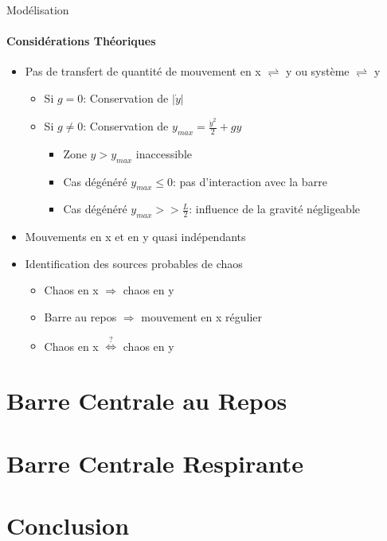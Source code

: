 \documentclass{beamer}
\begin{document}
  \begin{frame}{Modélisation}
  \framesubtitle{Considérations Théoriques}
  \begin{itemize}
    \item Pas de transfert de quantité de mouvement en x \(\rightleftharpoons\) y ou système \(\rightleftharpoons\) y
     \begin{itemize}
       \item Si \(g=0\): Conservation de \(\lvert \dot{y} \rvert\)
       \item Si \(g\neq0\): Conservation de \(y_{max}=\frac{\dot{y}^2}{2}+gy\)
       \begin{itemize}
         \item Zone \(y>y_{max}\) inaccessible
         \item Cas dégénéré \(y_{max} \leq 0\): pas d'interaction avec la barre
         \item Cas dégénéré \(y_{max} >> \frac{L}{2}\): influence de la gravité négligeable
       \end{itemize}
     \end{itemize}
    \item Mouvements en x et en y quasi indépendants
    \item Identification des sources probables de chaos
    \begin{itemize}
      \item Chaos en x \(\Rightarrow\) chaos en y
      \item Barre au repos \(\Rightarrow\) mouvement en x régulier
      \item Chaos en x \(\overset{?}{\Leftrightarrow}\) chaos en y
    \end{itemize}
  \end{itemize}
  \end{frame}
  
  \section{Barre Centrale au Repos}
  
  \begin{frame}
  \end{frame}
  
  \section{Barre Centrale Respirante}
  
  \begin{frame}
  \end{frame}
  
  \section{Conclusion}
  
  \begin{frame}
  \end{frame}
  
\end{document}
